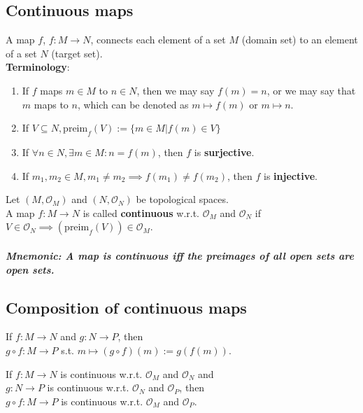 \subsection{Continuous maps}

A map $f$, $f: M \to N$, connects each element of a set $M$ (domain set) to an element of a set $N$ (target set). \\

\textbf{Terminology}: 
\begin{enumerate}
\item If $f$ maps $m \in M$ to $n \in N$, then we may say $f(m) = n$, or we may say that $m$ maps to $n$, which can be denoted as $m \mapsto f(m)$ or $m \mapsto n$.
\item If $V \subseteq N, \text{preim}_{f}(V) := \lbrace m \in M | f(m) \in V \rbrace$
\item If $\forall n \in N, \exists m \in M : n = f(m)$, then $f$ is \textbf{surjective}.
\item If $m_1, m_2 \in M, m_1 \neq m_2 \implies f(m_1) \neq f(m_2)$, then $f$ is \textbf{injective}.
\end{enumerate}

\begin{definition}
  Let $(M , \mathcal{O}_{M})$ and $(N , \mathcal{O}_{N})$ be topological spaces. \\
  A map $f: M \to N$ is called \textbf{continuous} w.r.t. $\mathcal{O}_{M}$ and $\mathcal{O}_{N}$ if \\
   $V \in \mathcal{O}_{N} \implies (\text{preim}_{f}(V)) \in \mathcal{O}_{M}$.
\end{definition}

\paragraph{\textit{Mnemonic: A map is continuous iff the preimages of all open sets are open sets.}}

\subsection{Composition of continuous maps}
If $f: M \to N$ and $g: N \to P$, then \\
$g \circ f: M \to P$ s.t. $m \mapsto (g \circ f)(m) := g(f(m))$. 

\begin{theorem}
  If $f: M \to N$ is continuous w.r.t. $\mathcal{O}_{M}$ and $\mathcal{O}_{N}$ and \\
  $g: N \to P$ is continuous w.r.t. $\mathcal{O}_{N}$ and $\mathcal{O}_{P}$, then \\
  $g \circ f: M \to P$ is continuous w.r.t. $\mathcal{O}_{M}$ and $\mathcal{O}_{P}$.
\end{theorem}

